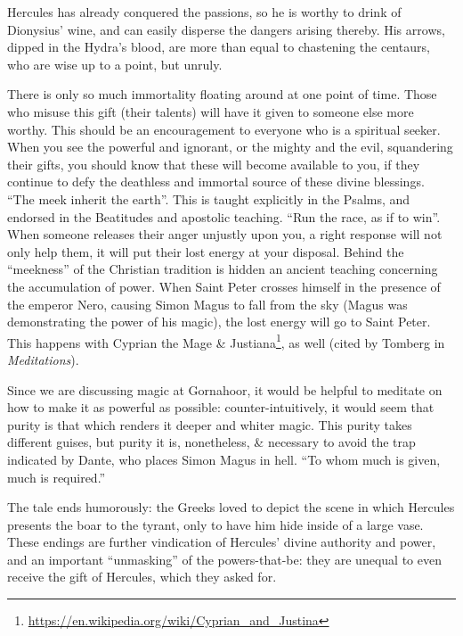 Hercules has already conquered the passions, so he is worthy to drink of Dionysius' wine, and can easily disperse the dangers arising thereby. His arrows, dipped in the Hydra's blood, are more than equal to chastening the centaurs, who are wise up to a point, but unruly.

There is only so much immortality floating around at one point of time. Those who misuse this gift (their talents) will have it given to someone else more worthy. This should be an encouragement to everyone who is a spiritual seeker. When you see the powerful and ignorant, or the mighty and the evil, squandering their gifts, you should know that these will become available to you, if they continue to defy the deathless and immortal source of these divine blessings. ``The meek inherit the earth''. This is taught explicitly in the Psalms, and endorsed in the Beatitudes and apostolic teaching. ``Run the race, as if to win''. When someone releases their anger unjustly upon you, a right response will not only help them, it will put their lost energy at your disposal. Behind the ``meekness'' of the Christian tradition is hidden an ancient teaching concerning the accumulation of power. When Saint Peter crosses himself in the presence of the emperor Nero, causing Simon Magus to fall from the sky (Magus was demonstrating the power of his magic), the lost energy will go to Saint Peter. This happens with Cyprian the Mage \& Justiana\footnote{\url{https://en.wikipedia.org/wiki/Cyprian\_and\_Justina}}, as well (cited by Tomberg in \emph{Meditations}).

Since we are discussing magic at Gornahoor, it would be helpful to meditate on how to make it as powerful as possible: counter-intuitively, it would seem that purity is that which renders it deeper and whiter magic. This purity takes different guises, but purity it is, nonetheless, \& necessary to avoid the trap indicated by Dante, who places Simon Magus in hell. ``To whom much is given, much is required.''

The tale ends humorously: the Greeks loved to depict the scene in which Hercules presents the boar to the tyrant, only to have him hide inside of a large vase. These endings are further vindication of Hercules' divine authority and power, and an important ``unmasking'' of the powers-that-be: they are unequal to even receive the gift of Hercules, which they asked for.

